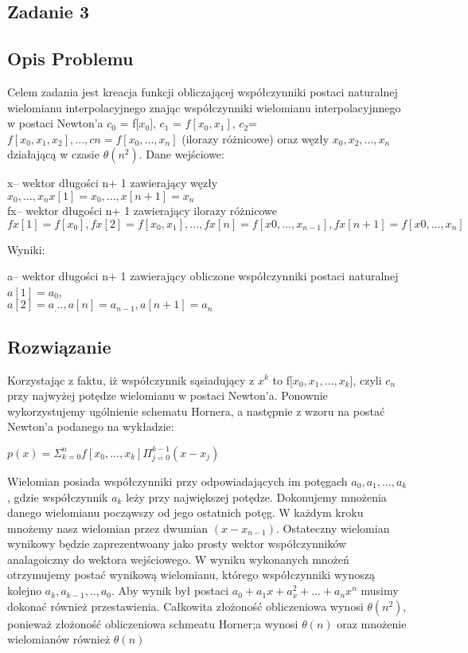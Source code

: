\documentclass[11pt]{article}
\begin{document}
\begin{flushleft}
\section{Zadanie 3}
\subsection{Opis Problemu}
Celem zadania jest kreacja funkcji obliczającej współczynniki postaci naturalnej wielomianu interpolacyjnego znając współczynniki wielomianu interpolacyjnnego w postaci Newton'a $c_0$ = f[$x_0$], $c_1$ = $f[x_0,x_1]$, $c_2$= $f[x_0, x_1, x_2],. . .,cn=f[x_0, . . . , x_n]$ (ilorazy różnicowe) oraz węzły $ x_0, x_2, . . . , x_n $ działającą w czasie $\theta(n^2)$. Dane wejściowe:\\
\begin{center}
x– wektor długości n+ 1 zawierający węzły $x_0, . . . , x_n x[1]=x_0,...,x[n+1]=x_n$ \\
fx– wektor długości n+ 1 zawierający ilorazy różnicowe $fx[1]=f[x_0],fx[2]=f[x_0, x_1],...,fx[n]=f[x0, . . . , x_{n−1}],fx[n+1]=f[x0, . . . , x_n]$\\
\begin{flushleft}
Wyniki:\\
\end{flushleft}
a– wektor długości n+ 1 zawierający obliczone współczynniki postaci naturalnej\\
$a[1]=a_0$,\\
$a[2]=a_...,a[n]=a_{n−1},a[n+1]=a_n$
\end{center}
\subsection{Rozwiązanie}
Korzystając z faktu, iż współczynnik sąsiadujący z $x^k$ to f[$x_0,x_1,...,x_k$], czyli $c_n$ przy najwyżej potędze wielomianu w postaci Newton'a. Ponownie wykorzystujemy ugólnienie schematu Hornera, a następnie z wzoru na postać Newton'a podanego na  wykładzie: \\
\begin{center}
$p(x) = \Sigma^n_{k=0} f[x_0,...,x_k] \Pi^{k-1}_{j=0}(x-x_j)$\\
\end{center}
Wielomian posiada współczynniki przy odpowiadających im potęgach $a_0,a_1,...,a_k$, gdzie współczynnik $a_k$ leży przy największej potędze. Dokonujemy mnożenia danego wielomianu począwszy od jego ostatnich potęg. W każdym kroku mnożemy nasz  wielomian przez dwumian $(x-x_{n-1})$. Ostateczny wielomian wynikowy będzie zaprezentwoany jako prosty wektor współczynników analagoiczny do wektora wejściowego. W wyniku wykonanych mnożeń otrzymujemy postać wynikową wielomianu, którego współczynniki wynoszą kolejno $a_k,a_{k-1},..,a_0$. Aby wynik był postaci $a_0+a_1x+a_x^2+...+a_nx^n$ musimy dokonać również przestawienia. Całkowita złożoność obliczeniowa wynosi $\theta(n^2)$, ponieważ złożoność obliczeniowa schmeatu Horner;a wynosi $\theta(n)$ oraz mnożenie wielomianów również $\theta(n)$
\newpage

\end{flushleft}
\end{document}
